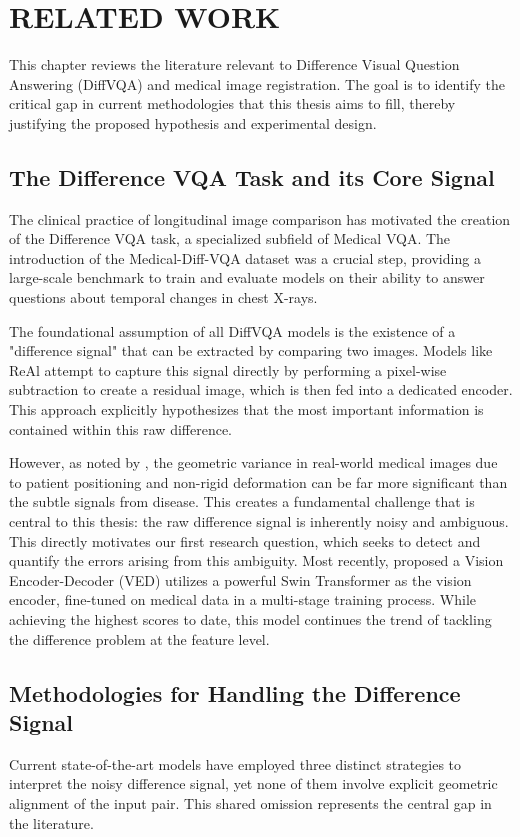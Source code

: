 \setlength{\footskip}{8mm}

\chapter{RELATED WORK}

This chapter reviews the literature relevant to Difference Visual Question Answering (DiffVQA) and medical image registration. The goal is to identify the critical gap in current methodologies that this thesis aims to fill, thereby justifying the proposed hypothesis and experimental design.

\section{The Difference VQA Task and its Core Signal}
The clinical practice of longitudinal image comparison has motivated the creation of the Difference VQA task, a specialized subfield of Medical VQA. The introduction of the Medical-Diff-VQA dataset \cite{medical-dff-vqa} was a crucial step, providing a large-scale benchmark to train and evaluate models on their ability to answer questions about temporal changes in chest X-rays.

The foundational assumption of all DiffVQA models is the existence of a "difference signal" that can be extracted by comparing two images. Models like ReAl \cite{real} attempt to capture this signal directly by performing a pixel-wise subtraction to create a residual image, which is then fed into a dedicated encoder. This approach explicitly hypothesizes that the most important information is contained within this raw difference.

However, as noted by \cite{medical-dff-vqa}, the geometric variance in real-world medical images due to patient positioning and non-rigid deformation can be far more significant than the subtle signals from disease. This creates a fundamental challenge that is central to this thesis: the raw difference signal is inherently noisy and ambiguous. This directly motivates our first research question, which seeks to detect and quantify the errors arising from this ambiguity. Most recently, \cite{encoder-decoder} proposed a Vision Encoder-Decoder (VED) utilizes a powerful Swin Transformer as the vision encoder, fine-tuned on medical data in a multi-stage training process. While achieving the highest scores to date, this model continues the trend of tackling the difference problem at the feature level.  

\section{Methodologies for Handling the Difference Signal}
Current state-of-the-art models have employed three distinct strategies to interpret the noisy difference signal, yet none of them involve explicit geometric alignment of the input pair. This shared omission represents the central gap in the literature.

